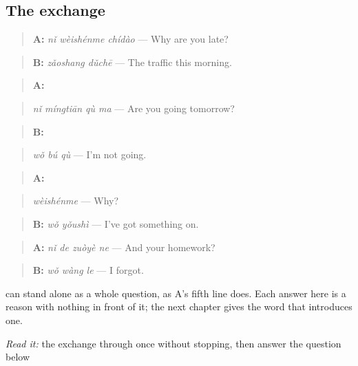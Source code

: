 \subsection*{The exchange}
\begin{quote}
\textbf{A:} \emph{nǐ wèishénme chídào} — Why are you late?
\end{quote}

\begin{quote}
\textbf{B:} \emph{zǎoshang dǔchē} — The traffic this morning.
\end{quote}

\begin{quote}
\textbf{A:} 
\end{quote}

\begin{quote}
\emph{nǐ míngtiān qù ma} — Are you going tomorrow?
\end{quote}

\begin{quote}
\textbf{B:} 
\end{quote}

\begin{quote}
\emph{wǒ bú qù} — I'm not going.
\end{quote}

\begin{quote}
\textbf{A:} 
\end{quote}

\begin{quote}
\emph{wèishénme} — Why?
\end{quote}

\begin{quote}
\textbf{B:} \emph{wǒ yǒushì} — I've got something on.
\end{quote}

\begin{quote}
\textbf{A:} \emph{nǐ de zuòyè ne} — And your homework?
\end{quote}

\begin{quote}
\textbf{B:} \emph{wǒ wàng le} — I forgot.
\end{quote}

 can stand alone as a whole question, as A's fifth line does. Each answer here is a reason with nothing in front of it; the next chapter gives the word that introduces one.

\begin{tcolorbox}[breakable,skin=enhanced,colback=orange!6,colframe=orange!45!black,boxrule=0.5pt,arc=1mm,left=6pt,right=6pt,top=4pt,bottom=4pt,fonttitle=\bfseries,title={Read this}]
\emph{Read it:} the exchange through once without stopping, then answer the question below
\end{tcolorbox}

